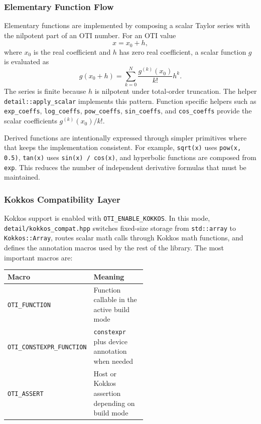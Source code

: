 \documentclass[11pt]{article}
\begin{document}
\subsubsection{Elementary Function Flow}

Elementary functions are implemented by composing a scalar Taylor series with
the nilpotent part of an OTI number. For an OTI value
\[
    x = x_0 + h,
\]
where \(x_0\) is the real coefficient and \(h\) has zero real coefficient, a
scalar function \(g\) is evaluated as
\[
    g(x_0 + h)
    =
    \sum_{k=0}^{N}
    \frac{g^{(k)}(x_0)}{k!} h^k.
\]
The series is finite because \(h\) is nilpotent under total-order truncation.
The helper \texttt{detail::apply\_scalar} implements this pattern. Function
specific helpers such as \texttt{exp\_coeffs}, \texttt{log\_coeffs},
\texttt{pow\_coeffs}, \texttt{sin\_coeffs}, and \texttt{cos\_coeffs} provide
the scalar coefficients \(g^{(k)}(x_0)/k!\).

Derived functions are intentionally expressed through simpler primitives where
that keeps the implementation consistent. For example, \texttt{sqrt(x)} uses
\texttt{pow(x, 0.5)}, \texttt{tan(x)} uses \texttt{sin(x) / cos(x)}, and
hyperbolic functions are composed from \texttt{exp}. This reduces the number
of independent derivative formulas that must be maintained.

\subsubsection{Kokkos Compatibility Layer}

Kokkos support is enabled with \texttt{OTI\_ENABLE\_KOKKOS}. In this mode,
\texttt{detail/kokkos\_compat.hpp} switches fixed-size storage from
\texttt{std::array} to \texttt{Kokkos::Array}, routes scalar math calls through
Kokkos math functions, and defines the annotation macros used by the rest of
the library. The most important macros are:

\begin{center}
\begin{tabular}{lp{0.55\linewidth}}
\toprule
Macro & Meaning \\
\midrule
\texttt{OTI\_FUNCTION} & Function callable in the active build mode \\
\texttt{OTI\_CONSTEXPR\_FUNCTION} & \texttt{constexpr} plus device annotation when needed \\
\texttt{OTI\_ASSERT} & Host or Kokkos assertion depending on build mode \\
\bottomrule
\end{tabular}
\end{center}
\end{document}
